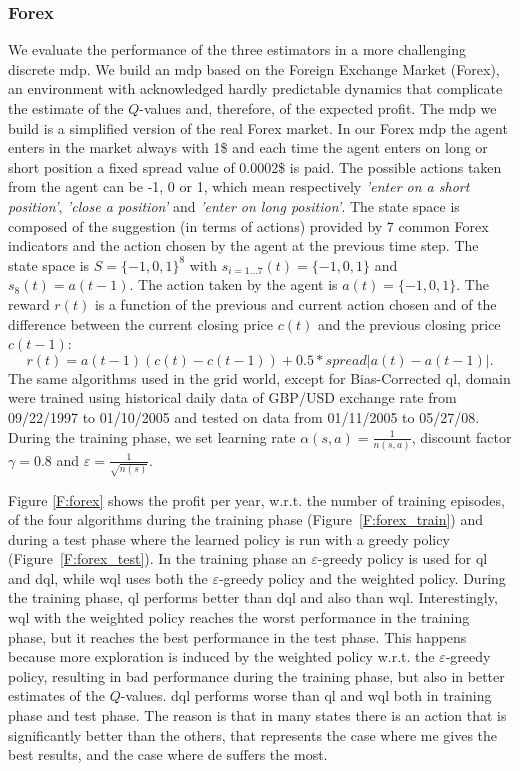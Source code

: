 \subsubsection{Forex}
We evaluate the performance of the three estimators in a more challenging discrete \gls{mdp}.
We build an \gls{mdp} based on the Foreign Exchange Market (Forex), an environment with acknowledged hardly predictable dynamics that complicate the estimate of the $Q$-values and, therefore, of the expected profit. The \gls{mdp} we build is a simplified version of the real Forex market. In our Forex \gls{mdp} the agent enters in the market always with 1\$ and each time the agent enters on long or short position a fixed spread value of 0.0002\$ is paid.
The possible actions taken from the agent can be -1, 0 or 1, which mean respectively \textit{'enter on a short position'}, \textit{'close a position'} and \textit{'enter on long position'}.
The state space is composed of the suggestion (in terms of actions) provided by 7 common Forex indicators and the action chosen by the agent at the previous time step.
The state space is $S = \lbrace -1, 0, 1 \rbrace ^8$ with $s_{i = 1...7}(t) = \lbrace -1, 0, 1 \rbrace$ and $s_8(t) = a(t - 1)$.
The action taken by the agent is $a(t) = \lbrace -1, 0, 1 \rbrace$.
The reward $r(t)$ is a function of the previous and current action chosen and of the difference between the current closing price $c(t)$ and the previous closing price $c(t - 1)$:
$$r(t) = a(t - 1)(c(t) - c(t - 1)) + 0.5 * spread |a(t) - a(t - 1)|.$$
The same algorithms used in the grid world, except for Bias-Corrected \gls{ql}, domain were trained using historical daily data of GBP/USD exchange rate from 09/22/1997 to 01/10/2005 and tested on data from 01/11/2005 to 05/27/08. 
During the training phase, we set learning rate $\alpha(s,a)=\frac{1}{n(s, a)}$, discount factor $\gamma=0.8$ and $\varepsilon=\frac{1}{\sqrt{n(s)}}$.

Figure \ref{F:forex} shows the profit per year, w.r.t. the number of training episodes, of the four algorithms during the training phase (Figure~\ref{F:forex_train}) and during a test phase where the learned policy is run with a greedy policy (Figure~\ref{F:forex_test}). In the training phase an $\varepsilon$-greedy policy is used for \gls{ql} and \gls{dql}, while \gls{wql} uses both the $\varepsilon$-greedy policy and the weighted policy.
During the training phase, \gls{ql} performs better than \gls{dql} and also than \gls{wql}. Interestingly, \gls{wql} with the weighted policy reaches the worst performance in the training phase, but it reaches the best performance in the test phase. This happens because more exploration is induced by the weighted policy w.r.t. the $\varepsilon$-greedy policy, resulting in bad performance during the training phase, but also in better estimates of the $Q$-values.
\gls{dql} performs worse than \gls{ql} and \gls{wql} both in training phase and test phase. 
The reason is that in many states there is an action that is significantly better than the others, that represents the case where \gls{me} gives the best results, and the case where \gls{de} suffers the most.


